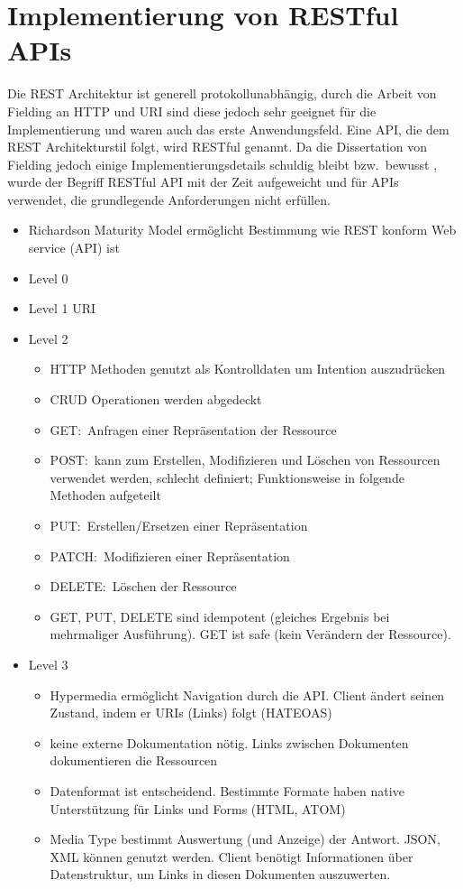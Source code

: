 \section{Implementierung von RESTful APIs}
Die REST Architektur ist generell protokollunabhängig, durch die Arbeit von Fielding an HTTP und URI sind diese jedoch sehr geeignet für die Implementierung und waren auch das erste Anwendungsfeld.\cite[vgl.][109,116]{REST}
Eine API, die dem REST Architekturstil folgt, wird RESTful genannt.
Da die Dissertation von Fielding jedoch einige Implementierungsdetails schuldig bleibt bzw.\ bewusst , wurde der Begriff RESTful API mit der Zeit aufgeweicht und für APIs verwendet, die grundlegende Anforderungen nicht erfüllen.\cite[vgl.][]{fieldBlog}
\par
\begin{itemize}
  \item Richardson Maturity Model ermöglicht Bestimmung wie REST konform Web service (API) ist
  \item Level 0
  \item Level 1
  URI
  \item Level 2
  \begin{itemize}
    \item HTTP Methoden genutzt als Kontrolldaten um Intention auszudrücken
    \item CRUD Operationen werden abgedeckt
    \item GET:\ Anfragen einer Repräsentation der Ressource
    \item POST:\ kann zum Erstellen, Modifizieren und Löschen von Ressourcen verwendet werden, schlecht definiert; Funktionsweise in folgende Methoden aufgeteilt
    \item PUT:\ Erstellen/Ersetzen einer Repräsentation
    \item PATCH:\ Modifizieren einer Repräsentation
    \item DELETE:\ Löschen der Ressource
    \item GET, PUT, DELETE sind idempotent (gleiches Ergebnis bei mehrmaliger Ausführung). GET ist safe (kein Verändern der Ressource).
  \end{itemize}
  \item Level 3
  \begin{itemize}
    \item Hypermedia ermöglicht Navigation durch die API\@. Client ändert seinen Zustand, indem er URIs (Links) folgt (HATEOAS)
    \item keine externe Dokumentation nötig. Links zwischen Dokumenten dokumentieren die Ressourcen
    \item Datenformat ist entscheidend. Bestimmte Formate haben native Unterstützung für Links und Forms (HTML, ATOM)
    \item Media Type bestimmt Auswertung (und Anzeige) der Antwort. JSON, XML können genutzt werden. Client benötigt Informationen über Datenstruktur, um Links in diesen Dokumenten auszuwerten.
  \end{itemize}
\end{itemize}

